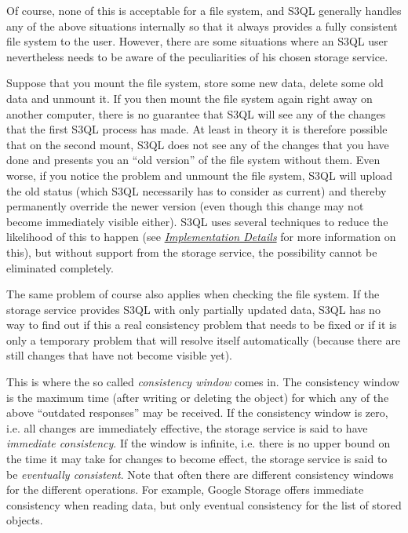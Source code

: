 \documentclass[letterpaper,10pt,english]{sphinxmanual}
\begin{document}
Of course, none of this is acceptable for a file system, and S3QL
generally handles any of the above situations internally so that it
always provides a fully consistent file system to the user. However,
there are some situations where an S3QL user nevertheless needs to be
aware of the peculiarities of his chosen storage service.

Suppose that you mount the file system, store some new data, delete
some old data and unmount it. If you then mount the file system again
right away on another computer, there is no guarantee that S3QL will
see any of the changes that the first S3QL process has made. At least
in theory it is therefore possible that on the second mount, S3QL does
not see any of the changes that you have done and presents you an ``old
version'' of the file system without them. Even worse, if you notice
the problem and unmount the file system, S3QL will upload the old
status (which S3QL necessarily has to consider as current) and thereby
permanently override the newer version (even though this change may
not become immediately visible either). S3QL uses several techniques
to reduce the likelihood of this to happen (see {\hyperref[impl_details:impl-details]{\emph{Implementation Details}}}
for more information on this), but without support from the storage
service, the possibility cannot be eliminated completely.

The same problem of course also applies when checking the file system.
If the storage service provides S3QL with only partially updated data,
S3QL has no way to find out if this a real consistency problem that
needs to be fixed or if it is only a temporary problem that will
resolve itself automatically (because there are still changes that
have not become visible yet).

This is where the so called \emph{consistency window} comes in. The
consistency window is the maximum time (after writing or deleting the
object) for which any of the above ``outdated responses'' may be
received. If the consistency window is zero, i.e. all changes are
immediately effective, the storage service is said to have \emph{immediate
consistency}. If the window is infinite, i.e. there is no upper bound
on the time it may take for changes to become effect, the storage
service is said to be \emph{eventually consistent}. Note that often there
are different consistency windows for the different operations. For
example, Google Storage offers immediate consistency when reading
data, but only eventual consistency for the list of stored objects.
\end{document}
